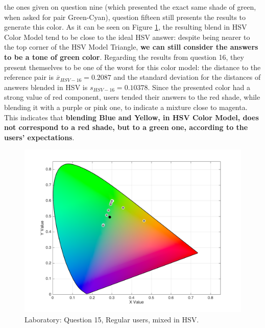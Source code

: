 \begin{enumerate}
  the ones given on question nine (which presented the exact same shade of green, when asked for pair Green-Cyan), question fifteen still presents the results to generate this color.
  As it can be seen on Figure \ref{fig:labhsvregular_15}, the resulting blend in HSV Color Model tend to be close to the ideal HSV answer: despite being nearer to the top corner of the HSV Model Triangle, \textbf{we can still
  consider the answers to be a tone of green color}. Regarding the results from question 16, they present themselves to be one of the worst for this color model: the distance to the reference pair is $\overline{x}_{HSV-16} = 0.2087$
  and the standard deviation for the distances of answers blended in HSV is $s_{HSV-16} = 0.10378$. Since the presented color had a strong value of red component, users tended their answers to the red shade, while blending
  it with a purple or pink one, to indicate a mixture close to magenta. This indicates that \textbf{blending Blue and Yellow, in HSV Color Model, does not correspond to a red shade, but to a green one, according to
  the users' expectations}.
  \begin{figure}[!htbp]
    \centering
    \begin{minipage}{0.4\textwidth}
      \centering
      \includegraphics[width=\textwidth]{images/results/15_lab_HSVresponses.png}
      \caption[Laboratory: Answers for Question 15, from regular users, mixed in HSV Color Model.]{Laboratory: Question 15, Regular users, mixed in HSV.}
      \label{fig:labhsvregular_15}
    \end{minipage}
    \begin{minipage}{0.4\textwidth}

\end{minipage}
\end{figure}
\end{enumerate}
